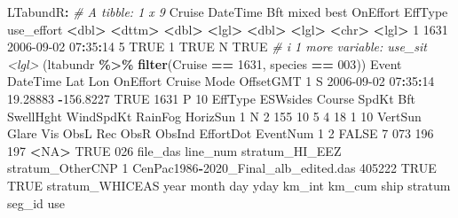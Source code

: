 \documentclass[
]{book}
\newenvironment{Shaded}{\begin{snugshade}}{\end{snugshade}}
\newcommand{\CommentTok}[1]{\textcolor[rgb]{0.56,0.35,0.01}{\textit{#1}}}
\newcommand{\ConstantTok}[1]{\textcolor[rgb]{0.56,0.35,0.01}{#1}}
\newcommand{\DecValTok}[1]{\textcolor[rgb]{0.00,0.00,0.81}{#1}}
\newcommand{\ErrorTok}[1]{\textcolor[rgb]{0.64,0.00,0.00}{\textbf{#1}}}
\newcommand{\FloatTok}[1]{\textcolor[rgb]{0.00,0.00,0.81}{#1}}
\newcommand{\FunctionTok}[1]{\textcolor[rgb]{0.13,0.29,0.53}{\textbf{#1}}}
\newcommand{\NormalTok}[1]{#1}
\newcommand{\SpecialCharTok}[1]{\textcolor[rgb]{0.81,0.36,0.00}{\textbf{#1}}}
\newcommand{\StringTok}[1]{\textcolor[rgb]{0.31,0.60,0.02}{#1}}
\begin{document}
\begin{Shaded}
\begin{Highlighting}[]
\NormalTok{LTabundR}\SpecialCharTok{:}
\CommentTok{\# A tibble: 1 x 9}
\NormalTok{  Cruise DateTime              Bft mixed  best OnEffort EffType use\_effort}
   \SpecialCharTok{\textless{}}\NormalTok{dbl}\SpecialCharTok{\textgreater{}} \ErrorTok{\textless{}}\NormalTok{dttm}\SpecialCharTok{\textgreater{}}              \ErrorTok{\textless{}}\NormalTok{dbl}\SpecialCharTok{\textgreater{}} \ErrorTok{\textless{}}\NormalTok{lgl}\SpecialCharTok{\textgreater{}} \ErrorTok{\textless{}}\NormalTok{dbl}\SpecialCharTok{\textgreater{}} \ErrorTok{\textless{}}\NormalTok{lgl}\SpecialCharTok{\textgreater{}}    \ErrorTok{\textless{}}\NormalTok{chr}\SpecialCharTok{\textgreater{}}   \ErrorTok{\textless{}}\NormalTok{lgl}\SpecialCharTok{\textgreater{}}     
\DecValTok{1}   \DecValTok{1631} \DecValTok{2006{-}09{-}02} \DecValTok{07}\SpecialCharTok{:}\DecValTok{35}\SpecialCharTok{:}\DecValTok{14}     \DecValTok{5} \ConstantTok{TRUE}      \DecValTok{1} \ConstantTok{TRUE}\NormalTok{     N       }\ConstantTok{TRUE}      
\CommentTok{\# i 1 more variable: use\_sit \textless{}lgl\textgreater{}}
\NormalTok{(ltabundr }\SpecialCharTok{\%\textgreater{}\%} \FunctionTok{filter}\NormalTok{(Cruise }\SpecialCharTok{==} \DecValTok{1631}\NormalTok{, species }\SpecialCharTok{==} \StringTok{\textquotesingle{}003\textquotesingle{}}\NormalTok{))}
\NormalTok{  Event            DateTime      Lat       Lon OnEffort Cruise Mode OffsetGMT}
\DecValTok{1}\NormalTok{     S }\DecValTok{2006{-}09{-}02} \DecValTok{07}\SpecialCharTok{:}\DecValTok{35}\SpecialCharTok{:}\DecValTok{14} \FloatTok{19.28883} \SpecialCharTok{{-}}\FloatTok{156.8227}     \ConstantTok{TRUE}   \DecValTok{1631}\NormalTok{    P        }\DecValTok{10}
\NormalTok{  EffType ESWsides Course SpdKt Bft SwellHght WindSpdKt RainFog HorizSun}
\DecValTok{1}\NormalTok{       N        }\DecValTok{2}    \DecValTok{155}    \DecValTok{10}   \DecValTok{5}         \DecValTok{4}        \DecValTok{18}       \DecValTok{1}       \DecValTok{10}
\NormalTok{  VertSun Glare Vis ObsL Rec ObsR ObsInd EffortDot EventNum}
\DecValTok{1}       \DecValTok{2} \ConstantTok{FALSE}   \DecValTok{7}  \DecValTok{073} \DecValTok{196}  \DecValTok{197}   \SpecialCharTok{\textless{}}\ConstantTok{NA}\SpecialCharTok{\textgreater{}}      \ConstantTok{TRUE}      \DecValTok{026}
\NormalTok{                              file\_das line\_num stratum\_HI\_EEZ stratum\_OtherCNP}
\DecValTok{1}\NormalTok{ CenPac1986}\SpecialCharTok{{-}}\NormalTok{2020\_Final\_alb\_edited.das   }\DecValTok{405222}           \ConstantTok{TRUE}             \ConstantTok{TRUE}
\NormalTok{  stratum\_WHICEAS year month day yday km\_int   km\_cum ship stratum seg\_id  use}

\end{Highlighting}
\end{Shaded}
\end{document}
